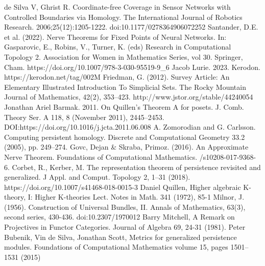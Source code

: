\documentclass[english,12pt]{article}
\numberwithin{equation}{section}
\theoremstyle{definition}
\theoremstyle{remark}
\begin{document}
\begin{thebibliography}{99}
  de Silva V, Ghrist R.
  \newblock Coordinate-free Coverage in Sensor Networks with Controlled Boundaries via Homology.
  \newblock The International Journal of Robotics Research. 2006;25(12):1205-1222.
  \newblock doi:10.1177/0278364906072252
  Santander, D.E. et al. (2022). 
  \newblock Nerve Theorems for Fixed Points of Neural Networks.
  \newblock In: Gasparovic, E., Robins, V., Turner, K. (eds)
  \newblock Research in Computational Topology 2. Association for Women in Mathematics Series, vol 30. Springer, Cham.
  \newblock https://doi.org/10.1007/978-3-030-95519-9\_6
  Jacob Lurie. 2023.
  \newblock Kerodon.
  \newblock https://kerodon.net/tag/002M
  Friedman, G. (2012).
  \newblock Survey Article: An Elementary Illustrated Introduction To Simplicial Sets.
  \newblock The Rocky Mountain Journal of Mathematics, 42(2), 353–423.
  \newblock http://www.jstor.org/stable/44240054
  Jonathan Ariel Barmak. 2011.
  \newblock On Quillen’s Theorem A for posets.
  \newblock J. Comb. Theory Ser. A 118, 8 (November 2011), 2445–2453.
  \newblock DOI:https://doi.org/10.1016/j.jcta.2011.06.008
  A. Zomorodian and G. Carlsson.
  \newblock Computing persistent homology.
  \newblock Discrete and Computational Geometry 33.2 (2005), pp. 249–274.
  Govc, Dejan \& Skraba, Primoz. (2016).
  \newblock An Approximate Nerve Theorem.
  \newblock Foundations of Computational Mathematics.
  /s10208-017-9368-6.
  Corbet, R., Kerber, M.
  \newblock The representation theorem of persistence revisited and generalized.
  \newblock J Appl. and Comput. Topology 2, 1–31 (2018).
  \newblock https://doi.org/10.1007/s41468-018-0015-3
  Daniel Quillen,
  \newblock Higher algebraic K-theory, I: Higher K-theories Lect.
  \newblock Notes in Math. 341 (1972), 85-1
  Milnor, J. (1956).
  \newblock Construction of Universal Bundles, II.
  \newblock Annals of Mathematics, 63(3), second series, 430-436.
  \newblock doi:10.2307/1970012
  Barry Mitchell,
  \newblock A Remark on Projectives in Functor Categories.
  \newblock Journal of Algebra 69, 24-31 (1981).
  Peter Bubenik, Vin de Silva, Jonathan Scott,
  \newblock Metrics for generalized persistence modules.
  \newblock Foundations of Computational Mathematics volume 15, pages 1501–1531 (2015)
\end{thebibliography}
\end{document}
